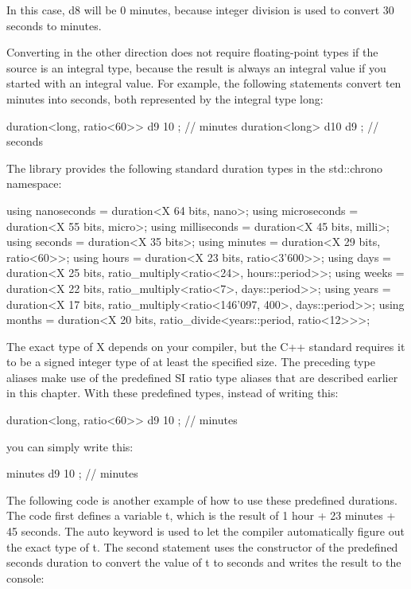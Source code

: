 In this case, d8 will be 0 minutes, because integer division is used to convert 30 seconds to minutes.

Converting in the other direction does not require floating-point types if the source is an integral type, because the result is always an integral value if you started with an integral value. For example, the following statements convert ten minutes into seconds, both represented by the integral type long:

\begin{cpp}
duration<long, ratio<60>> d9 { 10 }; // minutes
duration<long> d10 { d9 }; // seconds
\end{cpp}


The library provides the following standard duration types in the std::chrono namespace:

\begin{cpp}
using nanoseconds = duration<X 64 bits, nano>;
using microseconds = duration<X 55 bits, micro>;
using milliseconds = duration<X 45 bits, milli>;
using seconds = duration<X 35 bits>;
using minutes = duration<X 29 bits, ratio<60>>;
using hours = duration<X 23 bits, ratio<3'600>>;
using days = duration<X 25 bits, ratio_multiply<ratio<24>, hours::period>>;
using weeks = duration<X 22 bits, ratio_multiply<ratio<7>, days::period>>;
using years = duration<X 17 bits,
              ratio_multiply<ratio<146'097, 400>, days::period>>;
using months = duration<X 20 bits, ratio_divide<years::period, ratio<12>>>;
\end{cpp}

The exact type of X depends on your compiler, but the C++ standard requires it to be a signed integer type of at least the specified size. The preceding type aliases make use of the predefined SI ratio type aliases that are described earlier in this chapter. With these predefined types, instead of writing this:

\begin{cpp}
duration<long, ratio<60>> d9 { 10 }; // minutes
\end{cpp}

you can simply write this:

\begin{cpp}
minutes d9 { 10 }; // minutes
\end{cpp}

The following code is another example of how to use these predefined durations. The code first defines a variable t, which is the result of 1 hour + 23 minutes + 45 seconds. The auto keyword is used to let the compiler automatically figure out the exact type of t. The second statement uses the constructor of the predefined seconds duration to convert the value of t to seconds and writes the result to the console:

